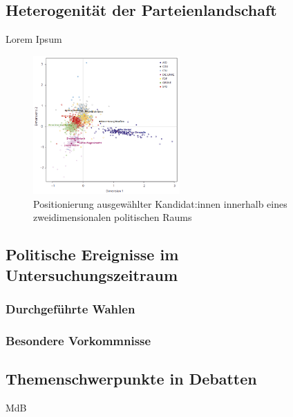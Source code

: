 \subsection{Heterogenität der Parteienlandschaft}\label{subsec:heterogenitätParteien}

Lorem Ipsum

\begin{figure}[H]
    \centering
    \includegraphics[width=0.5\textwidth]{data/images/positionierung_ausgewaehlter_kandidaten.png}
    \caption[Positionierung ausgewählter Kandidat:innen]{Positionierung ausgewählter Kandidat:innen innerhalb eines zweidimensionalen politischen Raums \autocite{saltzer_bundestagswahl_2022}} \label{fig:positionierungAusgewaehlterKanidaten}
\end{figure}

\subsection{Politische Ereignisse im Untersuchungszeitraum}

\subsubsection{Durchgeführte Wahlen}

\subsubsection{Besondere Vorkommnisse} 


\subsection{Themenschwerpunkte in Debatten}


\ac{MdB}


